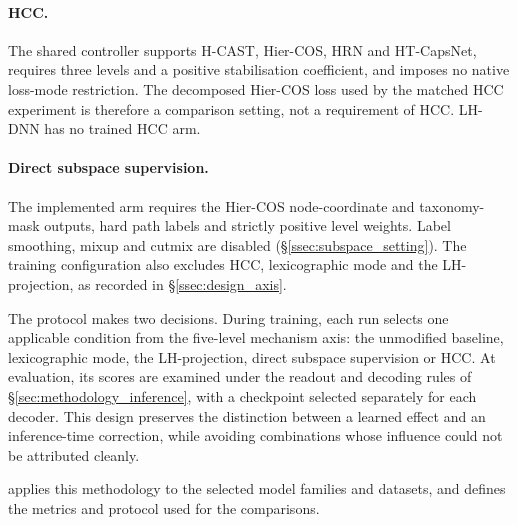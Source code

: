 \paragraph{HCC.}
The shared controller supports H-CAST, Hier-COS, HRN and HT-CapsNet, requires
three levels and a positive stabilisation coefficient, and imposes no native
loss-mode restriction. The decomposed Hier-COS loss used by the matched HCC
experiment is therefore a comparison setting, not a requirement of HCC.
LH-DNN has no trained HCC arm.

\paragraph{Direct subspace supervision.}
The implemented arm requires the Hier-COS node-coordinate and taxonomy-mask
outputs, hard path labels and strictly positive level weights. Label smoothing,
mixup and cutmix are disabled (\S\ref{ssec:subspace_setting}). The training
configuration also excludes HCC, lexicographic mode and the LH-projection, as
recorded in \S\ref{ssec:design_axis}.

\medskip

The protocol makes two decisions. During training, each run selects one
applicable condition from the five-level mechanism axis: the unmodified
baseline, lexicographic mode, the LH-projection, direct subspace supervision or
HCC. At evaluation, its scores are examined under the readout and decoding
rules of
\S\ref{sec:methodology_inference}, with a checkpoint selected separately for
each decoder. This design preserves the distinction between a learned effect
and an inference-time correction, while avoiding combinations whose influence
could not be attributed cleanly.

 applies this methodology to the selected model families
and datasets, and defines the metrics and protocol used for the comparisons.
